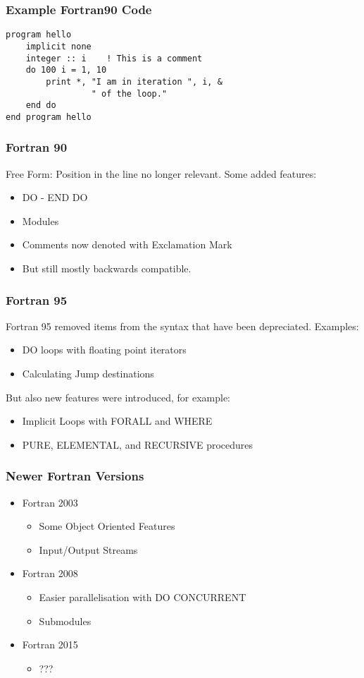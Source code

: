 \begin{frame}[fragile]
  \frametitle{Example Fortran90 Code}
  \begin{lstlisting}
program hello
    implicit none
    integer :: i    ! This is a comment
    do 100 i = 1, 10
        print *, "I am in iteration ", i, & 
                 " of the loop."
    end do
end program hello
  \end{lstlisting}
\end{frame}

\begin{frame}
  \frametitle{Fortran 90}
  Free Form: Position in the line no longer relevant.
  Some added features:
  \begin{itemize}
    \item DO - END DO
    \item Modules
    \item Comments now denoted with Exclamation Mark
    \item But still mostly backwards compatible.
  \end{itemize}
\end{frame}

\begin{frame}
  \frametitle{Fortran 95}
  Fortran 95 removed items from the syntax that have been depreciated.
  Examples:
  \begin{itemize}
    \item DO loops with floating point iterators
    \item Calculating Jump destinations
  \end{itemize}
  But also new features were introduced, for example:
  \begin{itemize}
    \item Implicit Loops with FORALL and WHERE
    \item PURE, ELEMENTAL, and RECURSIVE procedures
  \end{itemize}
\end{frame}

\begin{frame}
  \frametitle{Newer Fortran Versions}
  \begin{itemize}
    \item Fortran 2003
    \begin{itemize}
      \item Some Object Oriented Features
      \item Input/Output Streams
    \end{itemize}
    \item Fortran 2008
    \begin{itemize}
      \item Easier parallelisation with DO CONCURRENT
      \item Submodules
    \end{itemize}
    \item Fortran 2015
    \begin{itemize}
      \item ???
    \end{itemize}
  \end{itemize}
\end{frame}

